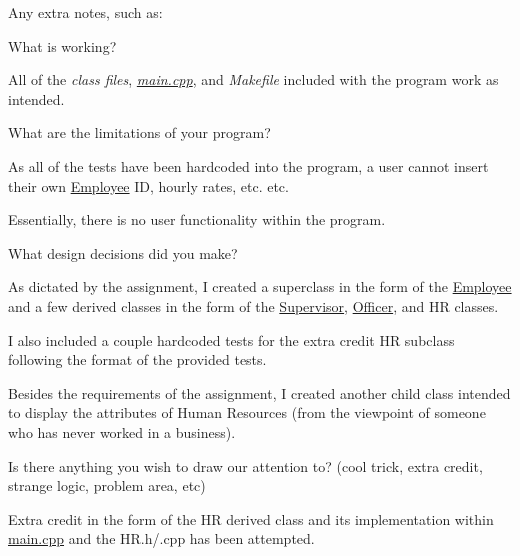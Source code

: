 Any extra notes, such as\+:
\begin{DoxyItemize}
\item What is working?
\begin{DoxyItemize}
\item All of the {\itshape class files}, {\itshape \hyperlink{main_8cpp}{main.\+cpp}}, and {\itshape Makefile} included with the program work as intended.
\end{DoxyItemize}
\item What are the limitations of your program?
\begin{DoxyItemize}
\item As all of the tests have been hardcoded into the program, a user cannot insert their own \hyperlink{classEmployee}{Employee} ID, hourly rates, etc. etc.
\item Essentially, there is no user functionality within the program.
\end{DoxyItemize}
\item What design decisions did you make?
\begin{DoxyItemize}
\item As dictated by the assignment, I created a superclass in the form of the \hyperlink{classEmployee}{Employee} and a few derived classes in the form of the \hyperlink{classSupervisor}{Supervisor}, \hyperlink{classOfficer}{Officer}, and HR classes.
\item I also included a couple hardcoded tests for the extra credit HR subclass following the format of the provided tests.
\item Besides the requirements of the assignment, I created another child class intended to display the attributes of Human Resources (from the viewpoint of someone who has never worked in a business).
\end{DoxyItemize}
\item Is there anything you wish to draw our attention to? (cool trick, extra credit, strange logic, problem area, etc)
\begin{DoxyItemize}
\item Extra credit in the form of the HR derived class and its implementation within \hyperlink{main_8cpp}{main.\+cpp} and the H\+R.\+h/.cpp has been attempted. 
\end{DoxyItemize}
\end{DoxyItemize}